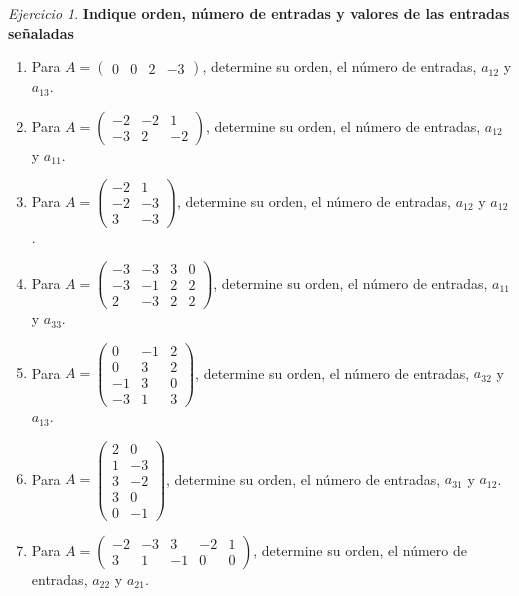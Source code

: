 \documentclass[12pt]{article}
\theoremstyle{remark}
\newtheorem{Ejer}[definicion]{Ejercicio}
\begin{document}
\begin{Ejer}
\textbf{Indique orden, número de entradas y valores de las entradas señaladas}
\begin{enumerate}[resume=banco]

\item Para $A=\begin{pmatrix}0&0&2&-3\end{pmatrix}$, determine su orden, el número de entradas, $a_{12}$ y $a_{13}$.

\item Para $A=\begin{pmatrix}-2&-2&1\\-3&2&-2\end{pmatrix}$, determine su orden, el número de entradas, $a_{12}$ y $a_{11}$.

\item Para $A=\begin{pmatrix}-2&1\\-2&-3\\3&-3\end{pmatrix}$, determine su orden, el número de entradas, $a_{12}$ y $a_{12}$.

\item Para $A=\begin{pmatrix}-3&-3&3&0\\-3&-1&2&2\\2&-3&2&2\end{pmatrix}$, determine su orden, el número de entradas, $a_{11}$ y $a_{33}$.

\item Para $A=\begin{pmatrix}0&-1&2\\0&3&2\\-1&3&0\\-3&1&3\end{pmatrix}$, determine su orden, el número de entradas, $a_{32}$ y $a_{13}$.

\item Para $A=\begin{pmatrix}2&0\\1&-3\\3&-2\\3&0\\0&-1\end{pmatrix}$, determine su orden, el número de entradas, $a_{31}$ y $a_{12}$.

\item Para $A=\begin{pmatrix}-2&-3&3&-2&1\\3&1&-1&0&0\end{pmatrix}$, determine su orden, el número de entradas, $a_{22}$ y $a_{21}$.


\end{enumerate}
\end{Ejer}
\end{document}
